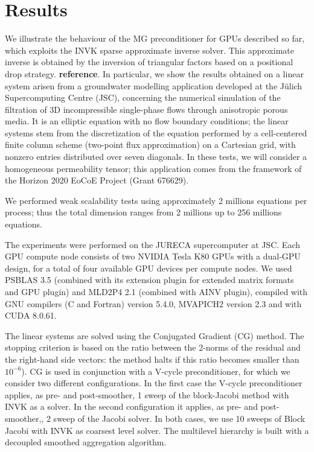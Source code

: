 \section{Results\label{results}}

We illustrate the behaviour of the MG preconditioner for GPUs described so far,
which exploits the INVK sparse approximate inverse solver. This approximate
inverse is obtained by the inversion of triangular
factors based on a positional drop strategy.
\textbf{reference}.
In particular, we show the results obtained on a linear system
arisen from a groundwater modelling application developed at the
J\"ulich Supercomputing Centre (JSC), concerning the numerical simulation
of the filtration of 3D incompressible single-phase flows through
anisotropic porous media. It is an elliptic equation with no flow
boundary conditions;  the linear systems stem from the discretization
of the equation performed by a cell-centered finite column scheme
(two-point flux approximation) on a Cartesian grid, with nonzero
entries distributed over seven diagonals. In these tests, we will
consider a homogeneous permeability tensor;  this application comes
from the framework of the Horizon 2020 EoCoE Project (Grant
676629). 

We performed weak scalability tests using approximately 2 millions
equations per process; thus  the total dimension ranges from 2
millions up to 256 millions equations. 

The experiments were performed on  the JURECA supercomputer at JSC.
Each GPU compute node consists
of two NVIDIA Tesla K80 GPUs with a dual-GPU design, for a total of
four available GPU devices per compute nodes.   
We used PSBLAS 3.5 (combined with its extension plugin for extended
matrix formats and GPU plugin) and MLD2P4 2.1 (combined with AINV
plugin),  compiled with  GNU compilers (C and Fortran) version 5.4.0,
MVAPICH2 version 2.3 and with CUDA 8.0.61. 

The linear systems are solved using the Conjugated Gradient (CG) method.
The stopping criterion is based on the ratio between the 2-norms of the
residual and the right-hand side vectors: the method halts if this ratio becomes smaller than $10^{-6}$).
CG is used in conjunction with a V-cycle preconditioner, for
which we consider two different configurations. In the first case the
V-cycle preconditioner applies, as pre- and post-smoother, 1 sweep of
the block-Jacobi method with INVK as a solver. In the
second configuration it applies, as pre- and post-smoother,, 2 sweep
of the Jacobi solver. In both cases, we use 10 sweeps of Block Jacobi with INVK  as
coarsest level solver.   The multilevel hierarchy is built with a
decoupled smoothed aggregation algorithm. 

